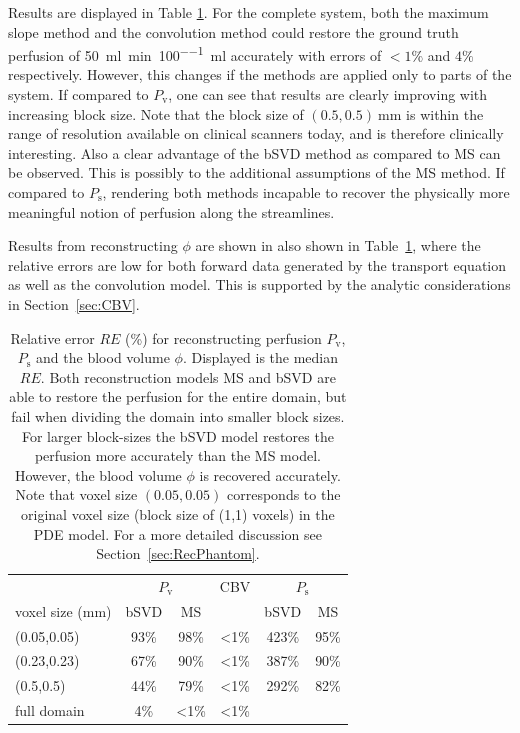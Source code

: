 \documentclass[journal,twocolumn]{IEEEtran}
\newcommand{\Perfv}{P_{\mathrm{v}}}
\newcommand{\Perfs}{P_{\mathrm{s}}}
\newcommand{\siPml}{\milli\litre\per\minute\per100\milli\litre}
\begin{document}
	Results are displayed in Table \ref{tab:resultsSim}. 
	For the complete system, both the maximum slope method and the convolution method could restore the ground truth perfusion of \SI{50}{\siPml} accurately with errors of $<1\%$ and $4\%$ respectively.
	However, this changes if the methods are applied only to parts of the system.
	If compared to $\Perfv$, one can see that results are clearly improving with increasing block size. Note that the block size of $(0.5,0.5)\SI{}{\milli\meter}$ is within the range of resolution available on clinical scanners today, and is therefore clinically interesting.
	Also a clear advantage of the bSVD method as compared to MS can be observed.
	This is possibly to the additional assumptions of the MS method.
	If compared to $\Perfs$, rendering both methods incapable to recover the physically more meaningful notion of perfusion along the streamlines.
		
	Results from reconstructing $\phi$ are shown in also shown in Table~\ref{tab:resultsSim}, where the relative errors are low for both forward data generated by the transport equation as well as the convolution model.
	This is supported by the analytic considerations in Section~\ref{sec:CBV}.
	
	\begin{table}[h!tb]
		\scriptsize
		\caption{Relative error $RE$ (\%) for reconstructing perfusion $\Perfv$, $\Perfs$ and the blood volume $\phi$. Displayed is the median $RE$. Both reconstruction models MS and bSVD are able to restore the perfusion for the entire domain, but fail when dividing the domain into smaller block sizes. For larger block-sizes the bSVD model restores the perfusion more accurately than the MS model. However, the blood volume $\phi$ is recovered accurately. Note that voxel size $(0.05,0.05)$ corresponds to the original voxel size (block size of (1,1) voxels) in the PDE model. For a more detailed discussion see Section~\ref{sec:RecPhantom}.}
		\centering
		\begin{tabular}{p{1cm} c c c c c}
						& \multicolumn{2}{c}{$\Perfv$} & CBV & \multicolumn{2}{c}{$\Perfs$}  \\
			voxel size (mm)	& bSVD	& MS 	&  		& bSVD	& MS 	\\ \toprule
			(0.05,0.05) 		& 93\%	& 98\%  & <1\%  & 423\%	& 95\% 	\\
			(0.23,0.23) 		& 67\%	& 90\% 	& <1\% 	& 387\%	& 90\% 	\\
			(0.5,0.5) 	& 44\%	& 79\% 	& <1\% 	& 292\%	& 82\% 	\\
			full domain   	& 4\%	& <1\%  & <1\%	& 		& 	   
		\end{tabular}
		\label{tab:resultsSim}
	\end{table}
	
\end{document}
